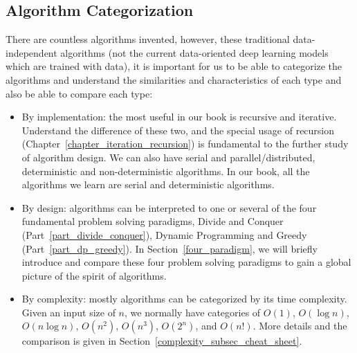 \documentclass[../main.tex]{subfiles}
\begin{document}
\subsection{Algorithm Categorization}
There are countless algorithms invented, however, these traditional data-independent algorithms (not the current data-oriented deep learning models which are trained with data), it is important for us to be able to categorize the algorithms and understand the similarities and characteristics of each type and also be able to compare each type: 
\begin{itemize}
    \item By implementation: the most useful in our book is recursive and iterative. Understand the difference of these two, and the special usage of recursion (Chapter~\ref{chapter_iteration_recursion}) is fundamental to the further study of algorithm design.  We can also have serial and parallel/distributed, deterministic and non-deterministic algorithms. In our book, all the algorithms we learn are  serial and deterministic algorithms. 
    \item By design: algorithms can be interpreted to one or several of the four fundamental problem solving paradigms, Divide and Conquer (Part~\ref{part_divide_conquer}), Dynamic Programming and Greedy (Part~\ref{part_dp_greedy}).  In Section~\ref{four_paradigm}, we will briefly introduce and compare these four problem solving paradigms to gain a global picture of the spirit of algorithms. 
    \item By complexity: mostly algorithms can be categorized by its time complexity. Given an input size of $n$, we normally have categories of $O(1)$, $O(\log n)$, $O(n\log n)$, $O(n^2)$, $O(n^3)$, $O(2^n)$, and $O(n!)$. More details and the comparison is given in Section~\ref{complexity_subsec_cheat_sheet}.
\end{itemize}
\end{document}
